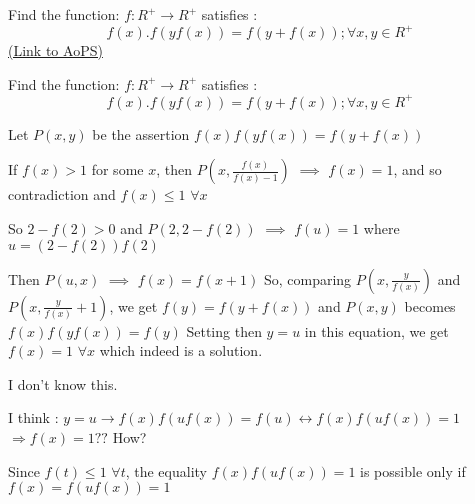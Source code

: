 \begin{problem}
	Find the function: $f:{R^ + } \to {R^ + }$ satisfies : 
\[f\left( x \right).f\left( {yf\left( x \right)} \right) = f\left( {y + f\left( x \right)} \right);\forall x,y \in {R^ + }\]
	\flushright \href{https://artofproblemsolving.com/community/c6h470980}{(Link to AoPS)}
\end{problem}



\begin{solution}
	\begin{tcolorbox}Find the function: $f:{R^ + } \to {R^ + }$ satisfies : 
\[f\left( x \right).f\left( {yf\left( x \right)} \right) = f\left( {y + f\left( x \right)} \right);\forall x,y \in {R^ + }\]\end{tcolorbox}
Let $P(x,y)$ be the assertion $f(x)f(yf(x))=f(y+f(x))$

If $f(x)>1$ for some $x$, then $P(x,\frac{f(x)}{f(x)-1})$ $\implies$ $f(x)=1$, and so contradiction and $f(x)\le 1$ $\forall x$

So $2-f(2)>0$ and $P(2,2-f(2))$ $\implies$ $f(u)=1$ where $u=(2-f(2))f(2)$

Then $P(u,x)$ $\implies$ $f(x)=f(x+1)$
So, comparing $P(x,\frac y{f(x)})$ and $P(x,\frac y{f(x)}+1)$, we get $f(y)=f(y+f(x))$ and $P(x,y)$ becomes $f(x)f(yf(x))=f(y)$
Setting then $y=u$ in this equation, we get $\boxed{f(x)=1}$ $\forall x$ which indeed is a solution.
\end{solution}






\begin{solution}
	\begin{tcolorbox}I don't know this. 

I think : 
$y = u \to f\left( x \right)f\left( {uf\left( x \right)} \right) = f\left( u \right) \leftrightarrow f\left( x \right)f\left( {uf\left( x \right)} \right) = 1$
$ \Rightarrow f\left( x \right) = 1??$ How?\end{tcolorbox}
Since $f(t)\le 1$ $\forall t$, the equality $f(x)f(uf(x))=1$ is possible only if $f(x)=f(uf(x))=1$
\end{solution}



